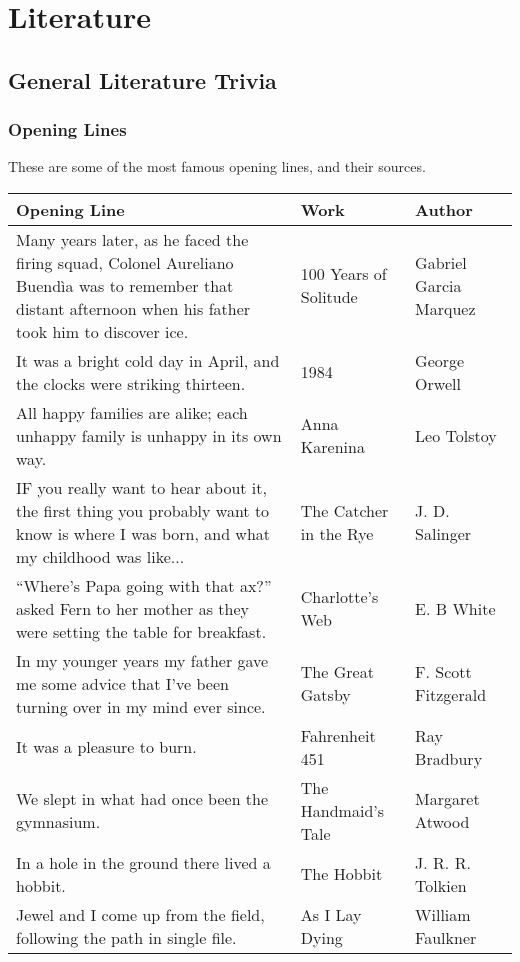 \chapter{Literature}
	\newpage
	\section{General Literature Trivia}
		\subsection{Opening Lines}
		These are some of the most famous opening lines, and their sources.
		\vspace{0.15in}
		
		\begin{longtable}{|p{3in}| p{1.4in}| p{1.4in}|}
		\hline
		\textbf{Opening Line} & \textbf{Work} & \textbf{Author} \\
		\hline
		
			Many years later, as he faced the firing squad, Colonel Aureliano Buend\`ia was to remember that distant afternoon when his father took him to discover ice. & 100 Years of Solitude & Gabriel Garcia Marquez \\
			
			\hline
		
			It was a bright cold day in April, and the clocks were striking thirteen. & 1984 & George Orwell \\
			\hline
			All happy families are alike; each unhappy family is unhappy in its own way. & Anna Karenina & Leo Tolstoy \\
			\hline
			IF you really want to hear about it, the first thing you probably want to know is where I was born, and what my childhood was like...& The Catcher in the Rye & J. D. Salinger \\	
			\hline
			``Where's Papa going with that ax?'' asked Fern to her mother as they were setting the table for breakfast. & Charlotte's Web & E. B White \\			
			\hline
			In my younger years my father gave me some advice that I've been turning over in my mind ever since. & The Great Gatsby & F. Scott Fitzgerald \\
			\hline
			It was a pleasure to burn. & Fahrenheit 451 & Ray Bradbury \\
			\hline
			We slept in what had once been the gymnasium. & The Handmaid's Tale & Margaret Atwood \\
			
			\hline
			In a hole in the ground there lived a hobbit.  & The Hobbit & J. R. R. Tolkien \\	
			\hline
			Jewel and I come up from the field, following the path in single file. & As I Lay Dying & William Faulkner \\
			

\end{longtable}
